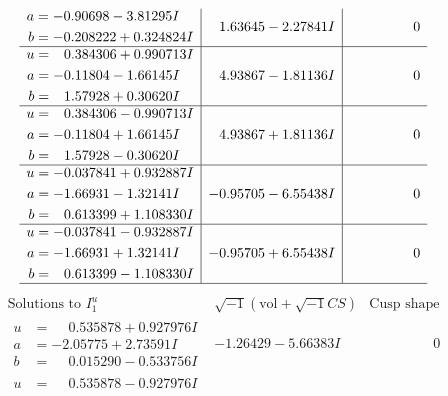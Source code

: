 \documentclass[1p]{elsarticle_modified}
\theoremstyle{definition}
\newcommand{\I}{\sqrt{-1}}
\begin{document}
$$\begin{array}{c|c|c}
\begin{aligned}
a &= -0.90698 - 3.81295 I \\
b &= -0.208222 + 0.324824 I\end{aligned}
 & \phantom{-}1.63645 - 2.27841 I & \phantom{-0.000000 } 0 \\ \hline\begin{aligned}
u &= \phantom{-}0.384306 + 0.990713 I \\
a &= -0.11804 - 1.66145 I \\
b &= \phantom{-}1.57928 + 0.30620 I\end{aligned}
 & \phantom{-}4.93867 - 1.81136 I & \phantom{-0.000000 } 0 \\ \hline\begin{aligned}
u &= \phantom{-}0.384306 - 0.990713 I \\
a &= -0.11804 + 1.66145 I \\
b &= \phantom{-}1.57928 - 0.30620 I\end{aligned}
 & \phantom{-}4.93867 + 1.81136 I & \phantom{-0.000000 } 0 \\ \hline\begin{aligned}
u &= -0.037841 + 0.932887 I \\
a &= -1.66931 - 1.32141 I \\
b &= \phantom{-}0.613399 + 1.108330 I\end{aligned}
 & -0.95705 - 6.55438 I & \phantom{-0.000000 } 0 \\ \hline\begin{aligned}
u &= -0.037841 - 0.932887 I \\
a &= -1.66931 + 1.32141 I \\
b &= \phantom{-}0.613399 - 1.108330 I\end{aligned}
 & -0.95705 + 6.55438 I & \phantom{-0.000000 } 0\\
 \hline 
 \end{array}$$\newpage$$\begin{array}{c|c|c}  
\text{Solutions to }I^u_{1}& \I (\text{vol} + \sqrt{-1}CS) & \text{Cusp shape}\\
 \hline 
\begin{aligned}
u &= \phantom{-}0.535878 + 0.927976 I \\
a &= -2.05775 + 2.73591 I \\
b &= \phantom{-}0.015290 - 0.533756 I\end{aligned}
 & -1.26429 - 5.66383 I & \phantom{-0.000000 } 0 \\ \hline\begin{aligned}
u &= \phantom{-}0.535878 - 0.927976 I \\

\end{aligned}
\end{array}$$
\end{document}
